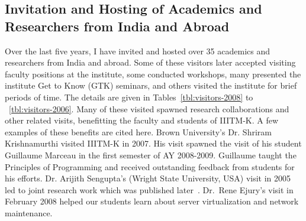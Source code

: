 \documentclass[titlepage, %
11pt, 
]{article}
\begin{document}
\subsection{Invitation and Hosting of Academics and Researchers from India and Abroad}
\label{subsec:invitations}

Over the last five years, I have invited and hosted over 35
academics and researchers from India and abroad.  Some of
these visitors later accepted visiting faculty positions at
the institute, some conducted workshops, many presented the
institute Get to Know (GTK) seminars, and others visited the
institute for brief periods of time.  The details are given
in Tables~\ref{tbl:visitors-2008} to
~\ref{tbl:visitors-2006}.  Many of these visited spawned
research collaborations and other related visits,
benefitting the faculty and students of IIITM-K.  A few
examples of these benefits are cited here.  Brown
University's Dr. Shriram Krishnamurthi visited IIITM-K in
2007. His visit spawned the visit of his student Guillaume
Marceau in the first semester of AY 2008-2009.  Guillaume
taught the Principles of Programming and received
outstanding feedback from students for his efforts.
Dr. Arijith Sengupta's (Wright State University, USA) visit
in 2005 led to joint research work which was published
later~\cite{choppella-et-al-afm07}.  Dr.~Rene Ejury's visit
in February 2008 helped our students learn about server
virtualization and network maintenance.
\end{document}
